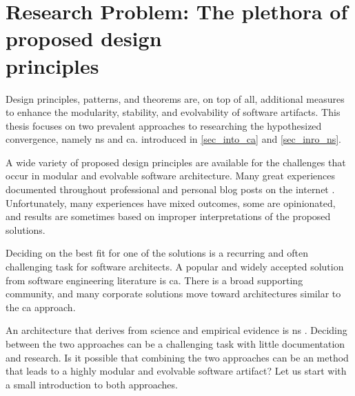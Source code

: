 \section{Research Problem: The plethora of proposed design \\ principles}
\label{sec_research_problem}

Design principles, patterns, and theorems are, on top of all, additional measures to
enhance the modularity, stability, and evolvability of software artifacts. This thesis
focuses on two prevalent approaches to researching the hypothesized convergence, namely
\gls{ns} and \gls{ca}. introduced in \ref{sec_into_ca} and \ref{sec_inro_ns}. 

A wide variety of proposed design principles are available for the challenges that occur
in modular and evolvable software architecture. Many great experiences documented
throughout professional and personal blog posts on the internet \parencites{noauthor_dont_nodate,
noauthor_generalization_nodate, noauthor_law_nodate}. Unfortunately, many
experiences have mixed outcomes, some are opinionated, and results are sometimes based on
improper interpretations of the proposed solutions.

Deciding on the best fit for one of the solutions is a recurring and often challenging task
for software architects. A popular and widely accepted solution from software engineering
literature is \gls{ca}. There is a broad supporting community, and many corporate
solutions move toward architectures similar to the \gls{ca}
approach. 

An architecture that derives from science and empirical evidence is \gls{ns}
\parencite{mannaert_normalized_2009,mannaert_normalized_2016}. Deciding between the two
approaches can be a challenging task with little documentation and research. Is it
possible that combining the two approaches can be an method that leads to a highly modular
and evolvable software artifact? Let us start with a small introduction to both
approaches.